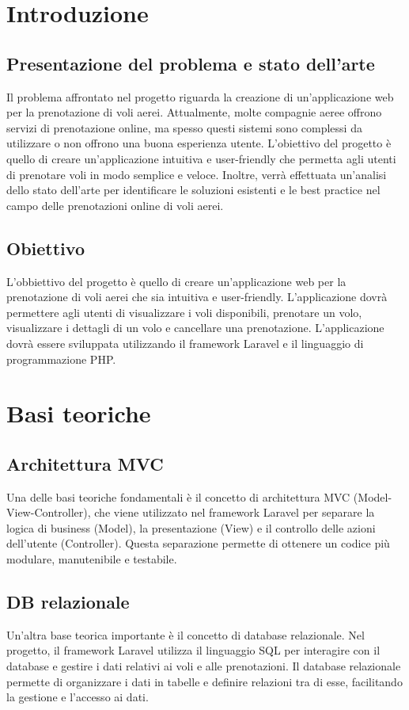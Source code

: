 \documentclass{article}
\begin{document}
\tableofcontents
\section{Introduzione}
\subsection{Presentazione del problema e stato dell'arte}
Il problema affrontato nel progetto riguarda la creazione di un'applicazione web per la prenotazione di voli aerei. Attualmente, molte compagnie aeree offrono servizi di prenotazione online, ma spesso questi sistemi sono complessi da utilizzare o non offrono una buona esperienza utente. L'obiettivo del progetto è quello di creare un'applicazione intuitiva e user-friendly che permetta agli utenti di prenotare voli in modo semplice e veloce. Inoltre, verrà effettuata un'analisi dello stato dell'arte per identificare le soluzioni esistenti e le best practice nel campo delle prenotazioni online di voli aerei.


\subsection{Obiettivo}
L'obbiettivo del progetto è quello di creare un'applicazione web per la prenotazione di voli aerei che sia intuitiva e user-friendly. L'applicazione dovrà permettere agli utenti di visualizzare i voli disponibili, prenotare un volo, visualizzare i dettagli di un volo e cancellare una prenotazione. L'applicazione dovrà essere sviluppata utilizzando il framework Laravel e il linguaggio di programmazione PHP.
\section{Basi teoriche}
\subsection{Architettura MVC}
Una delle basi teoriche fondamentali è il concetto di architettura MVC (Model-View-Controller), che viene utilizzato nel framework Laravel per separare la logica di business (Model), la presentazione (View) e il controllo delle azioni dell'utente (Controller). Questa separazione permette di ottenere un codice più modulare, manutenibile e testabile.


\subsection{DB relazionale}
Un'altra base teorica importante è il concetto di database relazionale. Nel progetto, il framework Laravel utilizza il linguaggio SQL per interagire con il database e gestire i dati relativi ai voli e alle prenotazioni. Il database relazionale permette di organizzare i dati in tabelle e definire relazioni tra di esse, facilitando la gestione e l'accesso ai dati.
\end{document}
